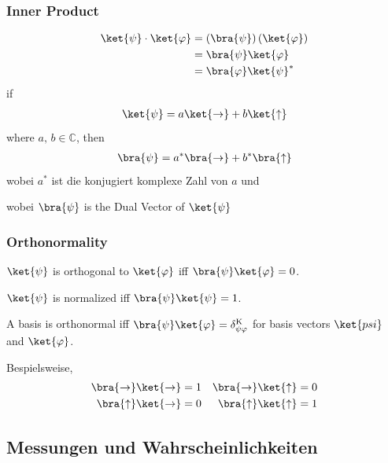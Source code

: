\documentclass{beamer}
\begin{document}
\begin{frame}
\frametitle{Inner Product}
\begin{align*}
\ket{\psi} \cdot \ket{\varphi} &= \left(\bra{\psi}\right)\left(\ket{\varphi}\right) \\
&= \bra{\psi}\ket{\varphi} \\
&= \bra{\varphi}\ket{\psi}^*
\end{align*}
if
\begin{align*}
\ket{\psi} = a\ket{\rightarrow} + b\ket{\uparrow}
\end{align*}
where $a,\,b\in\mathbb{C}$, then
\begin{align*}
\bra{\psi} = a^*\bra{\rightarrow} + b^*\bra{\uparrow}
\end{align*}
wobei $a^*$ ist die konjugiert komplexe Zahl von $a$ und

wobei $\bra{\psi}$ is the Dual Vector of $\ket{\psi}$
\end{frame}

\begin{frame}
\frametitle{Orthonormality}
$\ket{\psi}$ is orthogonal to $\ket{\varphi}$ iff $\bra{\psi}\ket{\varphi} = 0$.

\bigskip

$\ket{\psi}$ is normalized iff $\bra{\psi}\ket{\psi} = 1$.

\bigskip

A basis is orthonormal iff $\bra{\psi}\ket{\varphi} = \delta_{\psi\varphi}^\mathrm{K}$ for basis vectors $\ket{psi}$ and $\ket{\varphi}$.

\bigskip

Bespielsweise,
\begin{align*}
\bra{\rightarrow}\ket{\rightarrow} &= 1 &
\bra{\rightarrow}\ket{\uparrow} &= 0 \\
\bra{\uparrow}\ket{\rightarrow} &= 0 &
\bra{\uparrow}\ket{\uparrow} &= 1
\end{align*}
\end{frame}


\subsection{Messungen und Wahrscheinlichkeiten}
\end{document}
